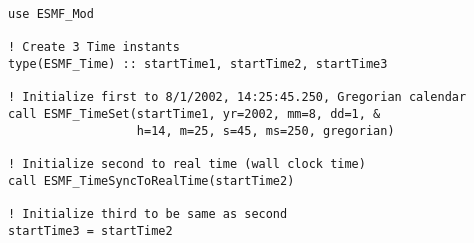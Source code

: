 
\begin{verbatim}
use ESMF_Mod

! Create 3 Time instants
type(ESMF_Time) :: startTime1, startTime2, startTime3

! Initialize first to 8/1/2002, 14:25:45.250, Gregorian calendar
call ESMF_TimeSet(startTime1, yr=2002, mm=8, dd=1, &
                  h=14, m=25, s=45, ms=250, gregorian)

! Initialize second to real time (wall clock time)
call ESMF_TimeSyncToRealTime(startTime2)

! Initialize third to be same as second
startTime3 = startTime2

\end{verbatim}

